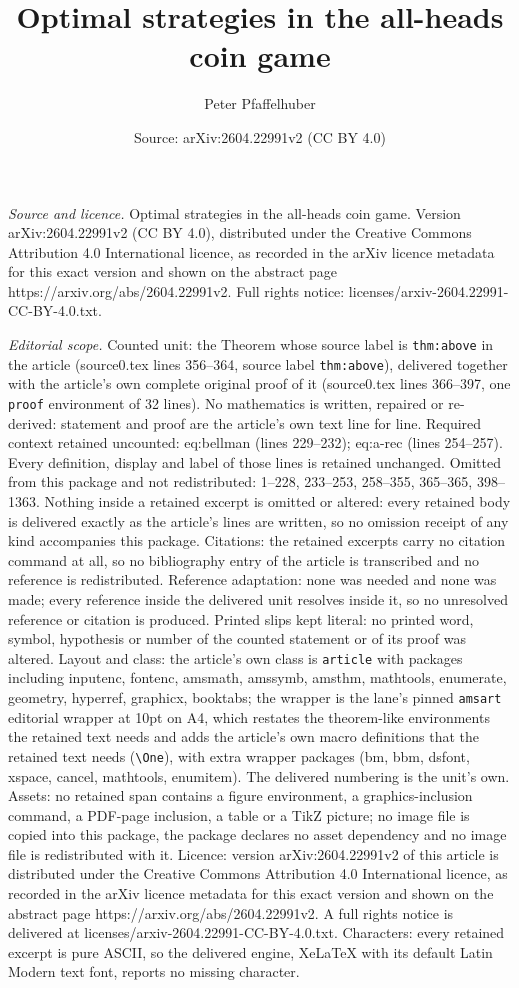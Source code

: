 \documentclass[10pt,a4paper]{amsart}
\title[Optimal strategies in the all-heads coin game]{Optimal strategies in the all-heads coin game}
\author{Peter Pfaffelhuber}
\date{Source: arXiv:2604.22991v2 (CC BY 4.0)}
\begin{document}
\maketitle

\noindent\emph{Source and licence.} Optimal strategies in the all-heads coin game. Version arXiv:2604.22991v2 (CC BY 4.0), distributed under the Creative Commons Attribution 4.0 International licence, as recorded in the arXiv licence metadata for this exact version and shown on the abstract page https://arxiv.org/abs/2604.22991v2. Full rights notice: licenses/arxiv-2604.22991-CC-BY-4.0.txt.\par\smallskip

\noindent\textit{Editorial scope.} Counted unit: the Theorem whose source label is \texttt{thm:above} in the article (source0.tex lines 356--364, source label \texttt{thm:above}), delivered together with the article's own complete original proof of it (source0.tex lines 366--397, one \texttt{proof} environment of 32 lines). No mathematics is written, repaired or re-derived: statement and proof are the article's own text line for line. Required context retained uncounted: eq:bellman (lines 229--232); eq:a-rec (lines 254--257). Every definition, display and label of those lines is retained unchanged. Omitted from this package and not redistributed: 1--228, 233--253, 258--355, 365--365, 398--1363. Nothing inside a retained excerpt is omitted or altered: every retained body is delivered exactly as the article's lines are written, so no omission receipt of any kind accompanies this package. Citations: the retained excerpts carry no citation command at all, so no bibliography entry of the article is transcribed and no reference is redistributed. Reference adaptation: none was needed and none was made; every reference inside the delivered unit resolves inside it, so no unresolved reference or citation is produced. Printed slips kept literal: no printed word, symbol, hypothesis or number of the counted statement or of its proof was altered. Layout and class: the article's own class is \texttt{article} with packages including inputenc, fontenc, amsmath, amssymb, amsthm, mathtools, enumerate, geometry, hyperref, graphicx, booktabs; the wrapper is the lane's pinned \texttt{amsart} editorial wrapper at 10pt on A4, which restates the theorem-like environments the retained text needs and adds the article's own macro definitions that the retained text needs (\texttt{\textbackslash One}), with extra wrapper packages (bm, bbm, dsfont, xspace, cancel, mathtools, enumitem). The delivered numbering is the unit's own. Assets: no retained span contains a figure environment, a graphics-inclusion command, a PDF-page inclusion, a table or a TikZ picture; no image file is copied into this package, the package declares no asset dependency and no image file is redistributed with it. Licence: version arXiv:2604.22991v2 of this article is distributed under the Creative Commons Attribution 4.0 International licence, as recorded in the arXiv licence metadata for this exact version and shown on the abstract page https://arxiv.org/abs/2604.22991v2. A full rights notice is delivered at licenses/arxiv-2604.22991-CC-BY-4.0.txt. Characters: every retained excerpt is pure ASCII, so the delivered engine, XeLaTeX with its default Latin Modern text font, reports no missing character.
\end{document}
